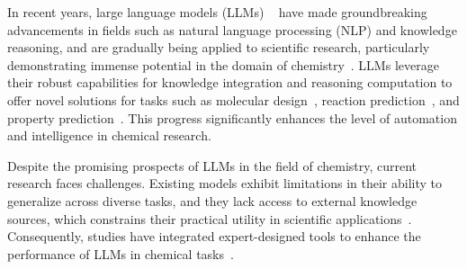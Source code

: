 



In recent years, large language models (LLMs) ~\cite{touvron2023llama,achiam2023gpt,deepseekai2025deepseekr1incentivizingreasoningcapability} have made groundbreaking advancements in fields such as natural language processing (NLP) and knowledge reasoning, and are gradually being applied to scientific research, particularly demonstrating immense potential in the domain of chemistry~\cite{guo2023largelanguagemodelschemistry,ouyang2024structuredchemistryreasoninglarge}. LLMs leverage their robust capabilities for knowledge integration and reasoning computation to offer novel solutions for tasks such as molecular design~\cite{noutahi2023gottasafenewframework}, reaction prediction~\cite{shi2023relmleveraginglanguagemodels}, and property prediction~\cite{srinivas2024crossmodallearningchemistryproperty}. This progress significantly enhances the level of automation and intelligence in chemical research.

Despite the promising prospects of LLMs in the field of chemistry, current research faces challenges. Existing models exhibit limitations in their ability to generalize across diverse tasks, and they lack access to external knowledge sources, which constrains their practical utility in scientific applications~\cite{zhao2024chemdfmlargelanguagefoundation,liao2024wordsmoleculessurveylarge,han2024generalistspecialistsurveylarge}. Consequently, studies have integrated expert-designed tools to enhance the performance of LLMs in chemical tasks~\cite{bran2023chemcrowaugmentinglargelanguagemodels,boiko2023autonomous,song2024multi}.



